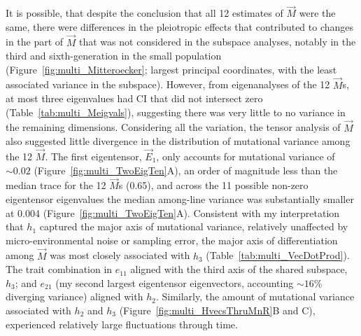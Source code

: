 It is possible, that despite the conclusion that all 12 estimates of $\vec{M}$ were the same, there were differences in the pleiotropic effects that contributed to changes in the part of $\vec{M}$ that was not considered in the subspace analyses, notably in the third and sixth-generation in the small population (Figure~\ref{fig:multi_Mitteroecker}; largest principal coordinates, with the least associated variance in the subspace). However, from eigenanalyses of the 12 $\vec{M}$s, at most three eigenvalues had CI that did not intersect zero (Table~\ref{tab:multi_Meigvals}), suggesting there was very little to no variance in the remaining dimensions. Considering all the variation, the tensor analysis of $\vec{M}$ also suggested little divergence in the distribution of mutational variance among the 12 $\vec{M}$. The first eigentensor, $\vec{E}_1$, only accounts for mutational variance of $\sim0.02$ (Figure~\ref{fig:multi_TwoEigTen}A), an order of magnitude less than the median trace for the 12 $\vec{M}$s (0.65), and across the 11 possible non-zero eigentensor eigenvalues the median among-line variance was substantially smaller at 0.004 (Figure~\ref{fig:multi_TwoEigTen}A). Consistent with my interpretation that $h_1$ captured the major axis of mutational variance, relatively unaffected by micro-environmental noise or sampling error, the major axis of differentiation among $\vec{M}$ was most closely associated with $h_3$ (Table~\ref{tab:multi_VecDotProd}). The trait combination in $e_{11}$ aligned with the third axis of the shared subspace, $h_3$; and $e_{21}$ (my second largest eigentensor eigenvectors, accounting $\sim16$\% diverging variance) aligned with $h_2$. Similarly, the amount of mutational variance associated with $h_2$ and $h_3$ (Figure~\ref{fig:multi_HvecsThruMnR}B and C), experienced relatively large fluctuations through time.\par

